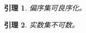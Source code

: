 \newtheorem{lemma}{引理}[chapter]%
\begin{lemma}偏序集可良序化。\end{lemma}
\begin{lemma}实数集不可数。  \end{lemma}
